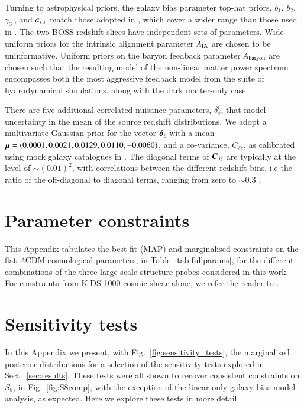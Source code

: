 \begin{appendix}
Turning to astrophysical priors, the galaxy bias parameter top-hat priors, $b_1$, $b_2$,  $\gamma_3^-$, and $a_{\rm vir}$ match those adopted in \citet{troester/etal:2020}, which cover a wider range than those used in \citet{sanchez/etal:2017}.  
The two BOSS redshift slices have independent sets of parameters.   
Wide uniform priors for the intrinsic alignment parameter $A_{\rm IA}$ are chosen to be uninformative.    
Uniform priors on the baryon feedback parameter $A_{\rm baryon}$ are chosen such that the resulting \citet{mead/etal:2015} model of the non-linear matter power spectrum encompasses both the most aggressive feedback model from the \citet{vandaalen/etal:2011} suite of hydrodynamical simulations, along with the dark matter-only case.

There are five additional correlated nuisance parameters, $\delta^i_z$, that model uncertainty in the mean of the source redshift distributions.  We adopt a multivariate Gaussian prior for the vector $\mbox{\boldmath $\delta$}_z$ with a mean $\mbox{\boldmath $\mu$} = (0.0001,0.0021,0.0129,0.0110,-0.0060)$, and a co-variance, $C_{\delta z}$, as calibrated using mock galaxy catalogues in \citet{wright/etal:2020}.   
The diagonal terms of $\mbox{\boldmath $C$}_{\delta z}$ are typically at the level of $\sim(0.01)^2$, with correlations between the different redshift bins, i.e the ratio of the off-diagonal to diagonal terms,  ranging from zero to $\sim 0.3$ \citep[see section 3 and figure 2 of][for details]{hildebrandt/etal:inprep}.


\section{Parameter constraints}
\label{app:parameter-constraints}
This Appendix tabulates the best-fit (MAP) and marginalised constraints on the flat $\Lambda$CDM cosmological parameters, in Table~\ref{tab:fullparams}, for the different combinations of the three large-scale structure probes considered in this work.   For constraints from KiDS-1000 cosmic shear alone, we refer the reader to \citet{asgari/etal:inprep}.


\section{Sensitivity tests}
\label{app:sensitivity}
In this Appendix we present, with Fig.~\ref{fig:sensitivity_tests}, the marginalised posterior distributions for a selection of the \tttp sensitivity tests explored in Sect.~\ref{sec:results}.  
These tests were all shown to recover consistent constraints on $S_8$, in Fig.~\ref{fig:S8comp}, with the exception of the linear-only galaxy bias model analysis, as expected.    
Here we explore these tests in more detail.    


\end{appendix}
